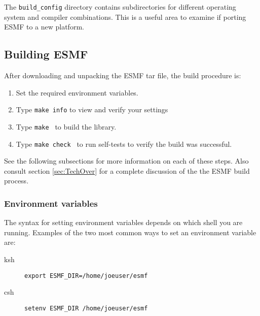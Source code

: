 The {\tt build\_config} directory contains subdirectories for
different operating system and compiler combinations. This is
a useful area to examine if porting ESMF to a new platform.

\subsection{Building ESMF}

After downloading and unpacking the ESMF tar file, the build procedure is:
\begin{enumerate}
\item Set the required environment variables. 
\item Type {\tt make info} to view and verify your settings
\item Type {\tt make } to build the library.
\item Type {\tt make check } to run self-tests to verify
the build was successful.
\end{enumerate}
See the following subsections for more information on each of these steps. Also
consult section \ref{sec:TechOver} for a complete discussion of the the ESMF
build process.

\subsubsection{Environment variables}

The syntax for setting environment variables depends on which shell
you are running.  Examples of the two most common ways to set 
an environment variable are:
\begin{description}
\item[ksh] {\tt  export ESMF\_DIR=/home/joeuser/esmf}
\item[csh] {\tt  setenv ESMF\_DIR /home/joeuser/esmf}
\end{description}

